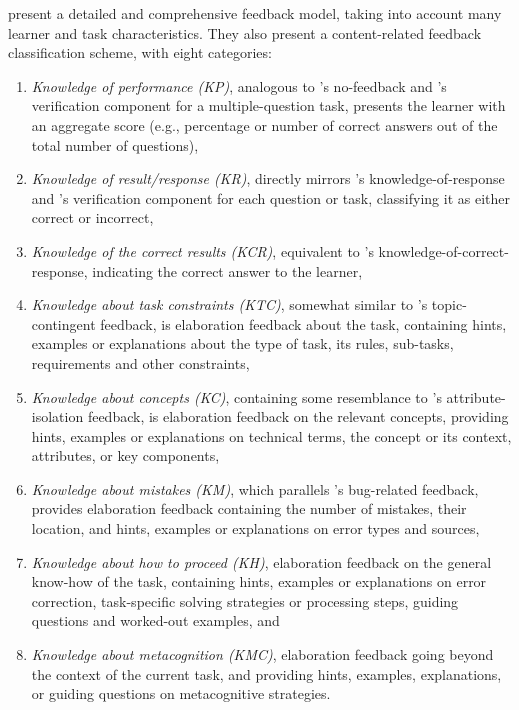 \citet{narciss_how_2004, narciss_feedback_2008} present a detailed and comprehensive feedback model, taking into account many learner and task characteristics. They also present a content-related feedback classification scheme, with eight categories: 
\begin{enumerate}[itemsep=0.05em,label=(\roman*)]
    \item \textit{Knowledge of performance (KP)}, analogous to \citet{mason_providing_2001}'s no-feedback and \citet{kulhavy_feedback_1989}'s verification component for a multiple-question task, presents the learner with an aggregate score (e.g., percentage or number of correct answers out of the total number of questions), 
    \item \textit{Knowledge of result/response (KR)}, directly mirrors \citet{mason_providing_2001}'s knowledge-of-response and \citet{kulhavy_feedback_1989}'s verification component for each question or task, classifying it as either correct or incorrect,
    \item \textit{Knowledge of the correct results (KCR)}, equivalent to \citet{mason_providing_2001}'s knowledge-of-correct-response, indicating the correct answer to the learner,
    \item \textit{Knowledge about task constraints (KTC)}, somewhat similar to \citet{mason_providing_2001}'s topic-contingent feedback, is elaboration feedback about the task, containing hints, examples or explanations about the type of task, its rules, sub-tasks, requirements and other constraints, 
    \item \textit{Knowledge about concepts (KC)}, containing some resemblance to \citet{mason_providing_2001}'s attribute-isolation feedback, is elaboration feedback on the relevant concepts, providing hints, examples or explanations on technical terms, the concept or its context, attributes, or key components, 
    \item \textit{Knowledge about mistakes (KM)}, which parallels \citet{mason_providing_2001}'s bug-related feedback, provides elaboration feedback containing the number of mistakes, their location, and hints, examples or explanations on error types and sources, 
    \item \textit{Knowledge about how to proceed (KH)}, elaboration feedback on the general know-how of the task, containing hints, examples or explanations on error correction, task-specific solving strategies or processing steps, guiding questions and worked-out examples, and
    \item \textit{Knowledge about metacognition (KMC)}, elaboration feedback going beyond the context of the current task, and providing hints, examples, explanations, or guiding questions on metacognitive strategies.
\end{enumerate}

